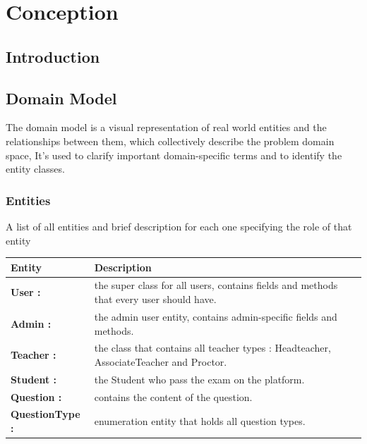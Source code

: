 \documentclass[]{uc2pfecaneva}
\begin{document}
    \setlength{\parskip}{6pt}
    \tableofcontents
    \setcounter{chapter}{1}
    \chapter{Conception}
    \newpage

    \raggedright\section{Introduction}
    \clearpage


    \begin{table}
        \raggedright\section{Domain Model}
        The domain model is a visual representation of real world entities and the relationships between them, which collectively describe the problem domain space, It's used to clarify important domain-specific terms and to identify the entity classes.
        \raggedright\subsection{Entities}
        A list of all entities and brief description for each one specifying the role of that entity\linebreak \\
        \begin{tabularx}{\textwidth}{|l|X|}
            \hline
            Entity          & Description                                                                                                                                                                \\ \hline
            \textbf{User :} & the super class for all users, contains fields and methods that every user should have.\\ \hline
            \textbf{Admin :} & the admin user entity, contains admin-specific fields and methods.\\ \hline
            \textbf{Teacher :} & the class that contains all teacher types : Headteacher, AssociateTeacher and Proctor.\\ \hline
            \textbf{Student :} & the Student who pass the exam on the platform.\\ \hline
            \textbf{Question :} & contains the content of the question.\\ \hline
            \textbf{QuestionType :} & enumeration entity that holds all question types.\\ \hline

\end{tabularx}
\end{table}
\end{document}
